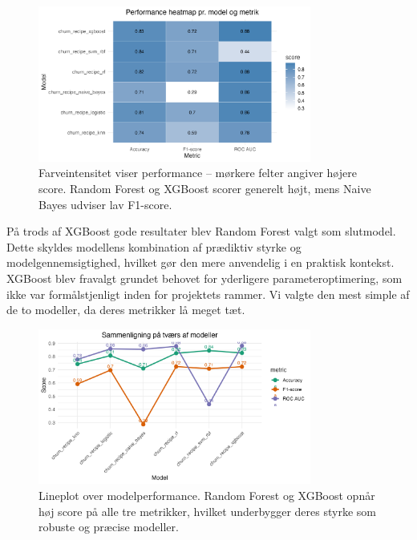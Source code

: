 \documentclass[
  11pt,
  letterpaper,
  DIV=11,
  numbers=noendperiod]{scrartcl}
\begin{document}
\begin{figure}[H]

{\centering \includegraphics[width=0.8\textwidth,height=\textheight]{images/3_heatmap_pr_model.png}

}

\caption{Farveintensitet viser performance -- mørkere felter angiver
højere score. Random Forest og XGBoost scorer generelt højt, mens Naive
Bayes udviser lav F1-score.}

\end{figure}%

På trods af XGBoost gode resultater blev Random Forest valgt som
slutmodel. Dette skyldes modellens kombination af prædiktiv styrke og
modelgennemsigtighed, hvilket gør den mere anvendelig i en praktisk
kontekst. XGBoost blev fravalgt grundet behovet for yderligere
parameteroptimering, som ikke var formålstjenligt inden for projektets
rammer. Vi valgte den mest simple af de to modeller, da deres metrikker
lå meget tæt.

\begin{figure}[H]

{\centering \includegraphics[width=0.8\textwidth,height=\textheight]{images/2_linje_plot.png}

}

\caption{Lineplot over modelperformance. Random Forest og XGBoost opnår
høj score på alle tre metrikker, hvilket underbygger deres styrke som
robuste og præcise modeller.}

\end{figure}%
\end{document}
